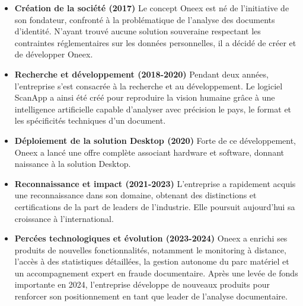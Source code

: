 \begin{itemize}
	\item \textbf{Création de la société (2017)}
	      Le concept Oneex est né de l’initiative de son fondateur, confronté à la problématique de l’analyse des documents d’identité. N’ayant trouvé aucune solution souveraine respectant les contraintes réglementaires sur les données personnelles, il a décidé de créer et de développer Oneex.

	\item \textbf{Recherche et développement (2018-2020)}
	      Pendant deux années, l’entreprise s’est consacrée à la recherche et au développement. Le logiciel ScanApp a ainsi été créé pour reproduire la vision humaine grâce à une intelligence artificielle capable d’analyser avec précision le pays, le format et les spécificités techniques d’un document.

	\item \textbf{Déploiement de la solution Desktop (2020)}
	      Forte de ce développement, Oneex a lancé une offre complète associant hardware et software, donnant naissance à la solution Desktop.

	\item \textbf{Reconnaissance et impact (2021-2023)}
	      L’entreprise a rapidement acquis une reconnaissance dans son domaine, obtenant des distinctions et certifications de la part de leaders de l’industrie. Elle poursuit aujourd’hui sa croissance à l’international.

	\item \textbf{Percées technologiques et évolution (2023-2024)}
	      Oneex a enrichi ses produits de nouvelles fonctionnalités, notamment le monitoring à distance, l’accès à des statistiques détaillées, la gestion autonome du parc matériel et un accompagnement expert en fraude documentaire. Après une levée de fonds importante en 2024, l’entreprise développe de nouveaux produits pour renforcer son positionnement en tant que leader de l’analyse documentaire.
\end{itemize}



